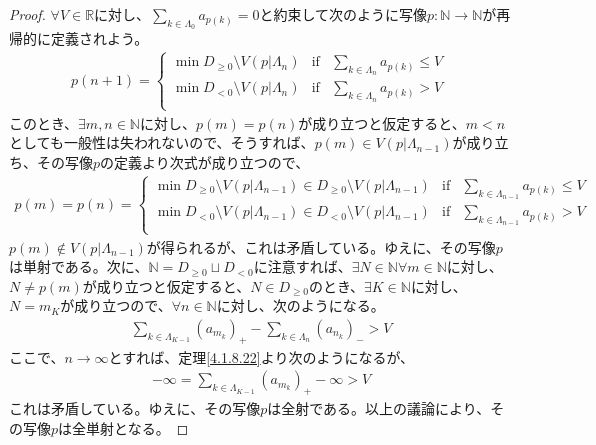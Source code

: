 \documentclass[dvipdfmx]{jsarticle}
\begin{document}
\begin{proof}
$\forall V \in \mathbb{R}$に対し、$\sum_{k \in \varLambda_{0}} a_{p(k)} = 0$と約束して次のように写像$p:\mathbb{N} \rightarrow \mathbb{N}$が再帰的に定義されよう。
\begin{align*}
p(n + 1) = \left\{ \begin{matrix}
\min D_{\geq 0} \setminus V\left( p|\varLambda_{n} \right) & \mathrm{if} & \sum_{k \in \varLambda_{n}} a_{p(k)} \leq V \\
\min D_{< 0} \setminus V\left( p|\varLambda_{n} \right) & \mathrm{if} & \sum_{k \in \varLambda_{n}} a_{p(k)} > V \\
\end{matrix} \right.\ 
\end{align*}
このとき、$\exists m,n \in \mathbb{N}$に対し、$p(m) = p(n)$が成り立つと仮定すると、$m < n$としても一般性は失われないので、そうすれば、$p(m) \in V\left( p|\varLambda_{n - 1} \right)$が成り立ち、その写像$p$の定義より次式が成り立つので、
\begin{align*}
p(m) = p(n) = \left\{ \begin{matrix}
\min{D_{\geq 0} \setminus V\left( p|\varLambda_{n - 1} \right)} \in D_{\geq 0} \setminus V\left( p|\varLambda_{n - 1} \right) & \mathrm{if} & \sum_{k \in \varLambda_{n - 1}} a_{p(k)} \leq V \\
\min{D_{< 0} \setminus V\left( p|\varLambda_{n - 1} \right)} \in D_{< 0} \setminus V\left( p|\varLambda_{n - 1} \right) & \mathrm{if} & \sum_{k \in \varLambda_{n - 1}} a_{p(k)} > V \\
\end{matrix} \right.\ 
\end{align*}
$p(m) \notin V\left( p|\varLambda_{n - 1} \right)$が得られるが、これは矛盾している。ゆえに、その写像$p$は単射である。次に、$\mathbb{N} = D_{\geq 0} \sqcup D_{<0}$に注意すれば、$\exists N \in \mathbb{N}\forall m \in \mathbb{N}$に対し、$N \neq p(m)$が成り立つと仮定すると、$N \in D_{\geq 0}$のとき、$\exists K \in \mathbb{N}$に対し、$N = m_{K}$が成り立つので、$\forall n \in \mathbb{N}$に対し、次のようになる。
\begin{align*}
\sum_{k \in \varLambda_{K - 1}} \left( a_{m_{k}} \right)_{+} - \sum_{k \in \varLambda_{n}} \left( a_{n_{k}} \right)_{-} > V
\end{align*}
ここで、$n \rightarrow \infty$とすれば、定理\ref{4.1.8.22}より次のようになるが、
\begin{align*}
- \infty = \sum_{k \in \varLambda_{K - 1}} \left( a_{m_{k}} \right)_{+} - \infty > V
\end{align*}
これは矛盾している。ゆえに、その写像$p$は全射である。以上の議論により、その写像$p$は全単射となる。\par

\end{proof}
\end{document}
